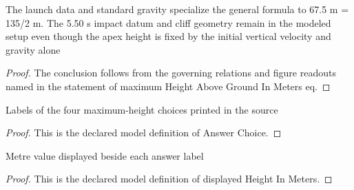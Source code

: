 \begin{lemma}
  \label{lem:physics:phyx-mini-0739:phyxminiproblems-problemphyxmini0739-maximumheightabovegroundinmeters-eq}
  The launch data and standard gravity specialize the general formula to 67.5 m = 135/2 m. The 5.50 s impact datum and cliff geometry remain in the modeled setup even though the apex height is fixed by the initial vertical velocity and gravity alone
\end{lemma}
\begin{proof}
  The conclusion follows from the governing relations and figure readouts named in the statement of maximum Height Above Ground In Meters eq.
\end{proof}
\begin{definition}
  \label{def:physics:phyx-mini-0739:phyxminiproblems-problemphyxmini0739-answerchoice}
  Labels of the four maximum-height choices printed in the source
\end{definition}
\begin{proof}
  This is the declared model definition of Answer Choice.
\end{proof}
\begin{definition}
  \label{def:physics:phyx-mini-0739:phyxminiproblems-problemphyxmini0739-displayedheightinmeters}
  Metre value displayed beside each answer label
\end{definition}
\begin{proof}
  This is the declared model definition of displayed Height In Meters.
\end{proof}
